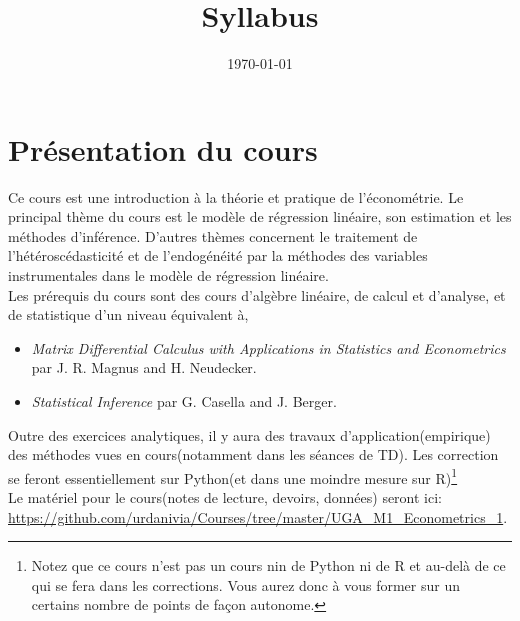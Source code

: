 
\title{Syllabus}
\date{\today}

\maketitle
\section*{ Présentation du cours}
Ce cours est une introduction  à la théorie et pratique de l'économétrie. Le principal thème du cours est le modèle de régression linéaire, son estimation et les méthodes d'inférence. D'autres thèmes concernent le traitement de l'hétéroscédasticité et de l'endogénéité par la méthodes des variables instrumentales dans le modèle de régression linéaire.\\
Les prérequis du cours sont  des cours d'algèbre linéaire, de calcul et d'analyse, et de statistique d'un niveau équivalent à,
\begin{itemize}
\item \emph{Matrix Differential Calculus with Applications in Statistics and Econometrics} par J. R. Magnus and H. Neudecker.
\item \emph{Statistical Inference} par  G. Casella and J. Berger.
\end{itemize}
Outre des exercices analytiques, il y aura des travaux d'application(empirique) des méthodes vues en cours(notamment dans les séances de TD). Les correction se feront essentiellement sur Python(et dans une moindre mesure sur R)\footnote{Notez que ce cours n'est pas un cours nin de Python ni de R et au-delà de ce qui se fera dans les corrections. Vous aurez donc à vous former sur un certains nombre de points de façon autonome.}\\
Le matériel pour le cours(notes de lecture, devoirs, données) seront ici:
\url{https://github.com/urdanivia/Courses/tree/master/UGA_M1_Econometrics_1}.


